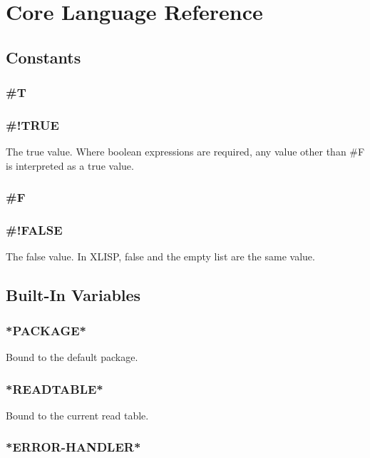 \documentclass[11pt]{article}
\begin{document}
\section{Core Language Reference}
\label{sec-4}

\subsection{Constants}
\label{sec-4-1}

\subsubsection{\#T}
\label{sec-4-1-1}
\subsubsection{\#!TRUE}
\label{sec-4-1-2}

The true value.  Where boolean expressions are required, any value
other than \#F is interpreted as a true value.
\subsubsection{\#F}
\label{sec-4-1-3}
\subsubsection{\#!FALSE}
\label{sec-4-1-4}

The false value.  In XLISP, false and the empty list are the same
value.
\subsection{Built-In Variables}
\label{sec-4-2}

\subsubsection{\textrm{*PACKAGE*}}
\label{sec-4-2-1}

Bound to the default package.
\subsubsection{\textrm{*READTABLE*}}
\label{sec-4-2-2}

Bound to the current read table.
\subsubsection{\textrm{*ERROR-HANDLER*}}
\label{sec-4-2-3}
\end{document}
